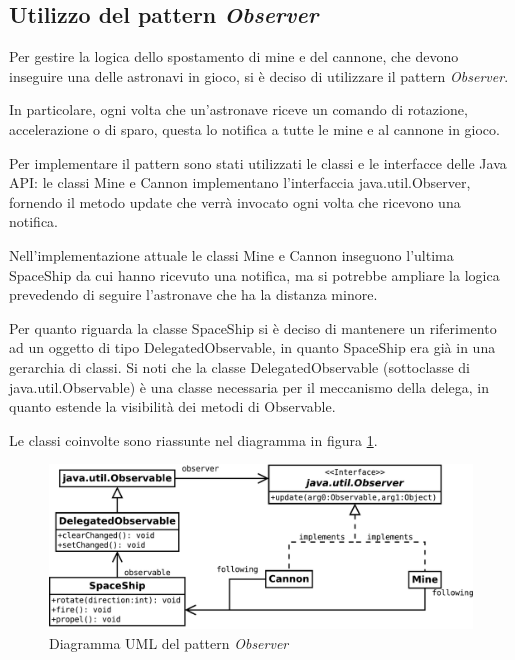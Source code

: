 \documentclass[a4paper,12pt]{article}
\begin{document}
\subsection{Utilizzo del pattern \emph{Observer}}

Per gestire la logica dello spostamento di mine e del cannone, che devono inseguire una delle astronavi in gioco, si \`e deciso di utilizzare il pattern \emph{Observer}.

In particolare, ogni volta che un'astronave riceve un comando di rotazione, accelerazione o di sparo, questa lo notifica a tutte le mine e al cannone in gioco.

Per implementare il pattern sono stati utilizzati le classi e le interfacce delle Java API: le classi \textsf{Mine} e \textsf{Cannon} implementano l'interfaccia \textsf{java.util.Observer}, fornendo il metodo \textsf{update} che verr\`a invocato ogni volta che ricevono una notifica.

Nell'implementazione attuale le classi \textsf{Mine} e \textsf{Cannon} inseguono l'ultima \textsf{SpaceShip} da cui hanno ricevuto una notifica, ma si potrebbe ampliare la logica prevedendo di seguire l'astronave che ha la distanza minore.

Per quanto riguarda la classe \textsf{SpaceShip} si \`e deciso di mantenere un riferimento ad un oggetto di tipo \textsf{DelegatedObservable}, in quanto \textsf{SpaceShip} era gi\`a in una gerarchia di classi. Si noti che la classe \textsf{DelegatedObservable} (sottoclasse di \textsf{java.util.Observable}) \`e una classe necessaria per il meccanismo della delega, in quanto estende la visibilit\`a dei metodi di \textsf{Observable}.

Le classi coinvolte sono riassunte nel diagramma in figura \ref{img:Observer}.

\begin{figure}[ht]
\centering
\includegraphics[width=14cm]{Observer.pdf}
\caption{Diagramma UML del pattern \emph{Observer}}
\label{img:Observer}
\end{figure}
\end{document}
